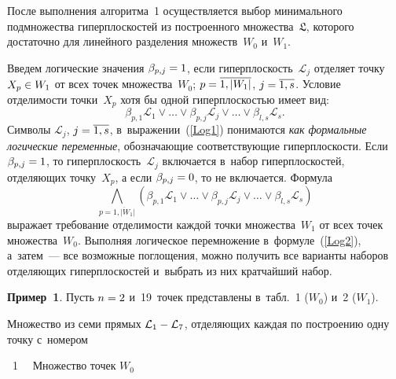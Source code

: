 \begin{multicols}{2}
После выполнения алгоритма~1 осуществляется выбор минимального 
подмножества гиперплоскостей из построенного множества~$\mathfrak{L}$, 
которого достаточно для линейного разделения множеств~$W_0$  и~$W_1$.

Введем логические значения $\beta_{p,j}\hm=1$, если гиперплоскость~$\mathcal{L}_j$ 
отделяет точку $X_p\hm\in W_1$ от всех точек множества~$W_0$; 
 $p\hm=\overline{1,|W_1 |}$,  $j\hm=\overline{1,s}$. 
 Условие отделимости точки~$X_p$ хотя бы одной гипер\-плос\-костью имеет вид:
\begin{equation}
\label{Log1}
\beta_{p,1}\mathcal{L}_1\vee \dots \vee \beta_{p,j}\mathcal{L}_j\vee \dots \vee 
\beta_{l,s}\mathcal{ L}_s.
\end{equation}
Символы $\mathcal{L}_j$, $j\hm=\overline{1,s}$, в~выражении~(\ref{Log1}) 
понимаются \textit{как формальные логические переменные}, 
обозначающие соответствующие гиперплоскости. Если $\beta_{p,j}\hm=1$, 
то гиперплоскость~$\mathcal{L}_j$ включается в~набор гиперплоскостей, 
отделяющих точку~$X_p$, а если $\beta_{p,j}\hm=0$, то не включается. Формула
\begin{equation}
\label{Log2}
\bigwedge\limits_{p=\overline{1,|W_1 |}} 
\left(\beta_{p,1}\mathcal{L}_1\vee \dots \vee \beta_{p,j}\mathcal{L}_j\vee 
\dots \vee \beta_{l,s}\mathcal{ L}_s \right)
\end{equation}
выражает требование отделимости каждой точки множества~$W_1$ от всех 
точек множества~$W_0$.
Выполняя логическое  перемножение  в~формуле~(\ref{Log2}), а~затем~--- 
все возможные поглощения, можно получить все варианты наборов отделяющих 
гиперплоскостей и~выбрать из них кратчайший набор.

\smallskip

\noindent
\textbf{Пример~1}. Пусть $n\hm=2$ и~19~точек представлены 
в~табл.~1 ($W_0$) и~2 ($W_1$).

Множество из семи прямых $\mathcal{L}_1\hm - \mathcal{L}_7$, 
от\-де\-ля\-ющих каждая по построению одну точку с~номером\linebreak\vspace*{-12pt}

{ \begin{center}  %
 
\noindent
{{\tablename~1}\ \ \small{
Множество точек $W_0$
}}
\end{center}}


\end{multicols}
